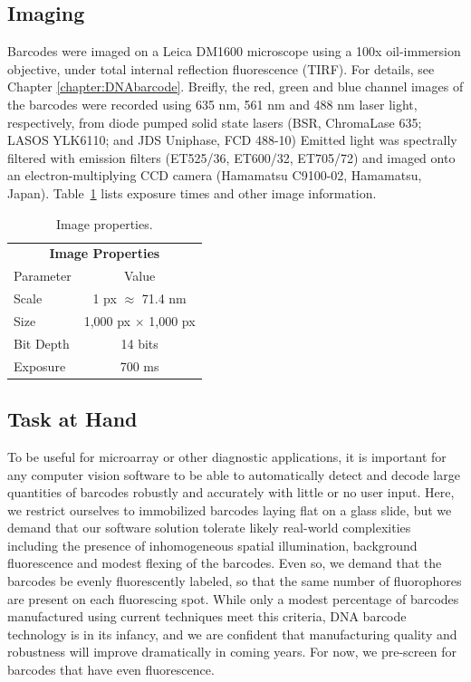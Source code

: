 \subsection{Imaging}
Barcodes were imaged on a Leica DM1600 microscope using a 100x oil-immersion objective,  under total internal reflection fluorescence (TIRF). For details, see Chapter \ref{chapter:DNAbarcode}. Breifly, the red, green and blue channel images of the barcodes were  recorded using  635 nm, 561 nm and 488 nm laser light, respectively, from diode pumped solid state lasers (BSR, ChromaLase 635; LASOS YLK6110; and JDS Uniphase, FCD 488-10)  Emitted light was spectrally filtered with emission filters (ET525/36, ET600/32, ET705/72) and imaged onto an electron-multiplying CCD camera (Hamamatsu C9100-02, Hamamatsu, Japan). Table~\ref{table:image} lists exposure times and other image information.

\begin{table}[htbp] 
\begin{center}
\begin{tabular}{l c}
\multicolumn{2}{c}{\textbf{Image Properties}}\\
Parameter & Value \\
\hline
Scale & 1 px $\approx$ 71.4 nm \\
Size & 1,000 px $\times$ 1,000 px \\
Bit Depth & 14 bits\\
Exposure & 700 ms\\
\hline
\end{tabular}
\end{center}
\caption{Image properties. \label{table:image}	}
\end{table}
 
\subsection{Task at Hand}
To be useful for microarray or other diagnostic applications, it is important for any computer vision software to be able to automatically detect and decode large quantities of barcodes robustly and accurately with little or no user input. 
Here, we restrict ourselves to immobilized barcodes laying flat on a glass slide, but we demand that our software solution tolerate likely real-world complexities including the presence of inhomogeneous spatial illumination, background fluorescence and modest flexing of the barcodes. Even so, we demand that the barcodes be evenly fluorescently labeled, so that the same number of fluorophores are present on each fluorescing spot. While only a modest percentage of barcodes manufactured using current techniques meet this criteria, DNA barcode technology is in its infancy, and we are confident that manufacturing quality and robustness will improve dramatically in coming years. For now, we pre-screen for barcodes that have even fluorescence.

